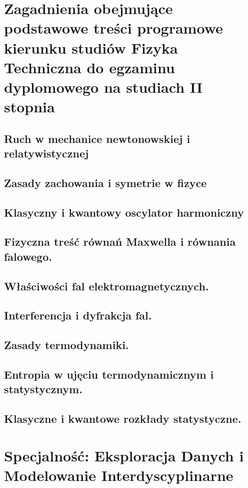 \documentclass[10pt,a4paper]{article} %
\begin{document}
    \pagestyle{plain}
    \title{\rmfamily\normalfont{}}
    \date{} %

    \maketitle

    \tableofcontents

    \section{Zagadnienia obejmujące podstawowe treści programowe kierunku studiów Fizyka Techniczna do egzaminu dyplomowego na studiach II stopnia}
    \subsection{Ruch w mechanice newtonowskiej i relatywistycznej}
    
    \subsection{Zasady zachowania i symetrie w fizyce}
	
	\subsection{Klasyczny i kwantowy oscylator harmoniczny}
	
	\subsection{Fizyczna treść równań Maxwella i równania falowego.}
	
	
	\subsection{Właściwości fal elektromagnetycznych.}
	
	
	\subsection{Interferencja i dyfrakcja fal.}
	
	
	\subsection{Zasady termodynamiki.}
	
	
	\subsection{Entropia w ujęciu termodynamicznym i statystycznym.}
	
	
	\subsection{Klasyczne i kwantowe rozkłady statystyczne.}
	
	
    \section{Specjalność: Eksploracja Danych i Modelowanie Interdyscyplinarne}
\end{document}

